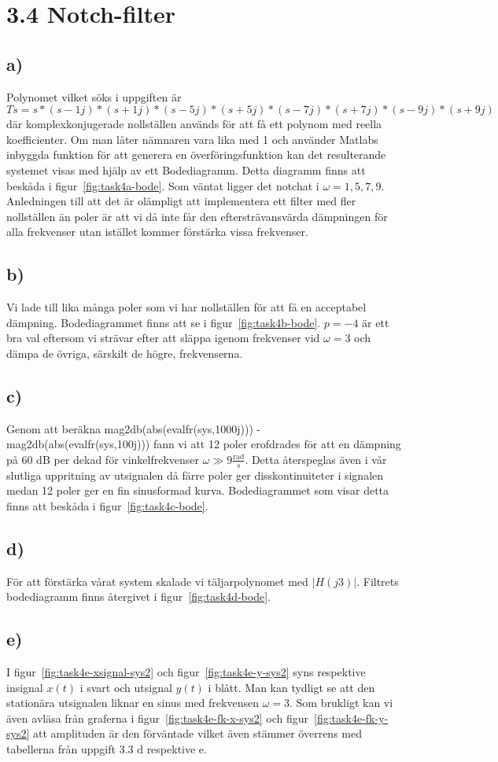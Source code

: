 \section*{3.4 Notch-filter}
\subsection*{a)}
Polynomet vilket söks i uppgiften är 
$Ts = s*(s-1j)*(s+1j)*(s-5j)*(s+5j)*(s-7j)*(s+7j)*(s-9j)*(s+9j)$ där
komplexkonjugerade nollställen används för att få ett polynom med reella
koefficienter. Om man låter nämnaren vara lika med 1 och använder Matlabs
inbyggda funktion för att generera en överföringsfunktion kan det resulterande
systemet visas med hjälp av ett Bodediagramm. Detta diagramm finns att beskåda i
figur~\ref{fig:task4a-bode}. Som väntat ligger det notchat i $\omega = 1, 5, 7,
9$. Anledningen till att det är olämpligt att implementera ett filter med fler
nollställen än poler är att vi då inte får den eftersträvansvärda dämpningen
för alla frekvenser utan istället kommer förstärka vissa frekvenser.

\subsection*{b)}
Vi lade till lika många poler som vi har nollställen för att få en acceptabel
dämpning. Bodediagrammet finns att se i figur~\ref{fig:task4b-bode}. $p=-4$ är
ett bra val eftersom vi strävar efter att släppa igenom frekvenser vid
$\omega = 3$ och dämpa de övriga, särskilt de högre, frekvenserna.

\subsection*{c)}
Genom att beräkna mag2db(abs(evalfr(sys,1000j))) -
mag2db(abs(evalfr(sys,100j))) fann vi att 12 poler erofdrades för att en
dämpning på 60 dB per dekad för vinkelfrekvenser $\omega \gg 9 
\frac{\text{rad}}{s}$. Detta återspeglas även i vår slutliga uppritning av
utsignalen då färre poler ger disskontinuiteter i signalen medan 12 poler ger
en fin sinusformad kurva. Bodediagrammet som visar detta finns att beskåda i
figur~\ref{fig:task4c-bode}.

\subsection*{d)}
För att förstärka vårat system skalade vi täljarpolynomet med $|H(j3)|$.
Filtrets bodediagramm finns återgivet i figur~\ref{fig:task4d-bode}.

\subsection*{e)}
I figur~\ref{fig:task4e-xsignal-sys2} och figur~\ref{fig:task4e-y-sys2}
syns respektive insignal $x(t)$ i svart och utsignal $y(t)$ i blått. Man kan
tydligt se att den stationära utsignalen liknar en sinus med frekvensen $\omega
= 3$. Som brukligt kan vi även avläsa från graferna i
figur~\ref{fig:task4e-fk-x-sys2} och figur~\ref{fig:task4e-fk-y-sys2} att
amplituden är den förväntade vilket även stämmer överrens med tabellerna från
uppgift 3.3 d respektive e.
